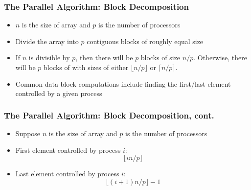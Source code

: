 \documentclass[13pt]{beamer}
\begin{document}
\begin{frame}
\frametitle{The Parallel Algorithm: Block Decomposition}
  \begin{itemize}
    \item $n$ is the size of array and $p$ is the number of processors
    \item Divide the array into $p$ contiguous blocks of roughly equal size
    \item If $n$ is divisible by $p$, then there will be $p$ blocks of size $n / p$. Otherwise, there will be $p$ blocks of with sizes of either $\lfloor n / p \rfloor$ or $\lceil n / p \rceil$.
    \item Common data block computations include finding the first/last element controlled by a given process
  \end{itemize}
\end{frame}

\begin{frame}
\frametitle{The Parallel Algorithm: Block Decomposition, cont.}
  \begin{itemize}
    \item Suppose $n$ is the size of array and $p$ is the number of processors
    \item First element controlled by process $i$: $$\lfloor i n / p \rfloor$$
    \item Last element controlled by process $i$: $$\lfloor (i + 1) n / p \rfloor - 1$$
  \end{itemize}
\end{frame}
\end{document}
